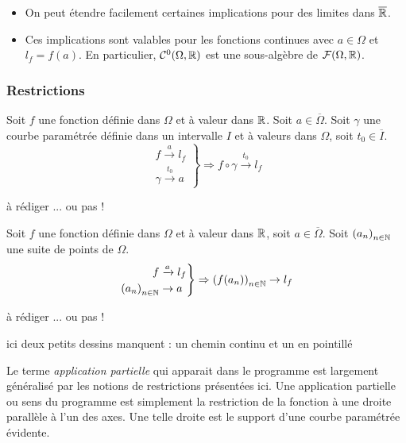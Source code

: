 \begin{rems}
 \begin{itemize}
  \item On peut étendre facilement certaines implications pour des limites dans $\overline{\mathbb{R}}$.
  \item Ces implications sont valables pour les fonctions continues avec $a\in \Omega$ et $l_f=f(a)$. En particulier, $\mathcal C^0(\Omega,\mathbb{R})$ est une sous-algèbre de $\mathcal F(\Omega, \mathbb{R})$.
 \end{itemize}

\end{rems}

\subsubsection{Restrictions}
\begin{prop}
 Soit $f$ une fonction définie dans $\Omega$ et à valeur dans $\mathbb{R}$. Soit $a\in \overline{\Omega}$. Soit $\gamma$ une courbe paramétrée définie dans un intervalle $I$ et à valeurs dans $\Omega$, soit $t_0\in \overline{I}$.
\begin{displaymath}
 \left. 
\begin{aligned}
 f\xrightarrow{a} l_f\\
\gamma \xrightarrow{t_0} a
\end{aligned}
\right\rbrace 
\Rightarrow f\circ \gamma \xrightarrow{t_0} l_f
\end{displaymath}
\end{prop}
\begin{demo}
 à rédiger ... ou pas !
\end{demo}
\begin{prop}
 Soit $f$ une fonction définie dans $\Omega$ et à valeur dans $\mathbb{R}$, soit $a\in \overline{\Omega}$. Soit $\left( a_n\right) _{n\in \mathbb{N}}$ une suite de points de $\Omega$.
\begin{displaymath}
 \left. 
\begin{aligned}
 f &\xrightarrow{a} l_f\\
 \left( a_n\right) _{n\in \mathbb{N}} &\rightarrow a
\end{aligned}
\right\rbrace 
\Rightarrow \left( f(a_n)\right) _{n\in \mathbb{N}} \rightarrow l_f
\end{displaymath}
\end{prop}
\begin{demo}
 à rédiger ... ou pas !
\end{demo}
ici deux petits dessins manquent : un chemin continu et un en pointillé
\begin{rem}
 Le terme \emph{application partielle} qui apparait dans le programme est largement généralisé par les notions de restrictions présentées ici. Une application partielle ou sens du programme est simplement la restriction de la fonction à une droite parallèle à l'un des axes. Une telle droite est le support d'une courbe paramétrée évidente.
\end{rem}

